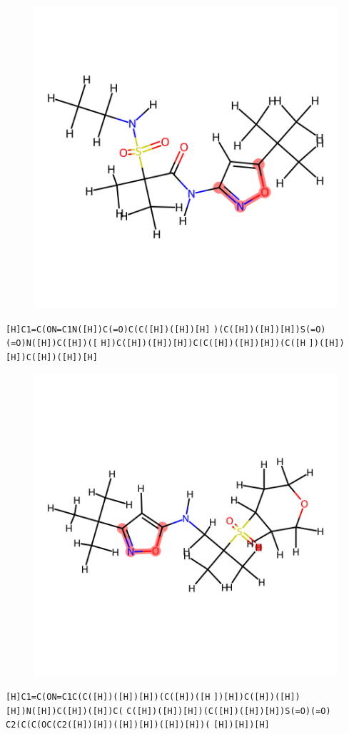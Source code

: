 \documentclass{article}
\begin{document}
\begin{figure}[ht]
\centering
    \includegraphics{mol200.png}
\end{figure}
\verb|[H]C1=C(ON=C1N([H])C(=O)C(C([H])([H])[H]| \verb|)(C([H])([H])[H])S(=O)(=O)N([H])C([H])([| \verb|H])C([H])([H])[H])C(C([H])([H])[H])(C([H| \verb|])([H])[H])C([H])([H])[H]|

\begin{figure}[ht]
\centering
    \includegraphics{mol201.png}
\end{figure}
\verb|[H]C1=C(ON=C1C(C([H])([H])[H])(C([H])([H| \verb|])[H])C([H])([H])[H])N([H])C([H])([H])C(| \verb|C([H])([H])[H])(C([H])([H])[H])S(=O)(=O)| \verb|C2(C(C(OC(C2([H])[H])([H])[H])([H])[H])(| \verb|[H])[H])[H]|
\end{document}
